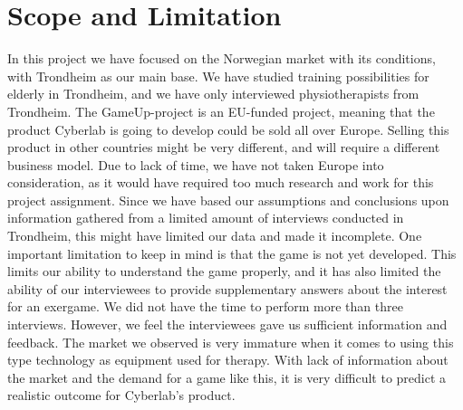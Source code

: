 \section{Scope and Limitation}
In this project we have focused on the Norwegian market with its conditions, with Trondheim as our main base. We have studied training possibilities for elderly in Trondheim, and we have only interviewed physiotherapists from Trondheim. The GameUp-project is an EU-funded project, meaning that the product Cyberlab is going to develop could be sold all over Europe. Selling this product in other countries might be very different, and will require a different business model. Due to lack of time, we have not taken Europe into consideration, as it would have required too much research and work for this project assignment. Since we have based our assumptions and conclusions upon information gathered from a limited amount of interviews conducted in Trondheim, this might have limited our data and made it incomplete. One important limitation to keep in mind is that the game is not yet developed. This limits our ability to understand the game properly, and it has also limited the ability of our interviewees to provide supplementary answers about the interest for an exergame. We did not have the time to perform more than three interviews. However, we feel the interviewees gave us sufficient information and feedback. The market we observed is very immature when it comes to using this type technology as equipment used for therapy. With lack of information about the market and the demand for a game like this, it is very difficult to predict a realistic outcome for Cyberlab’s product.

